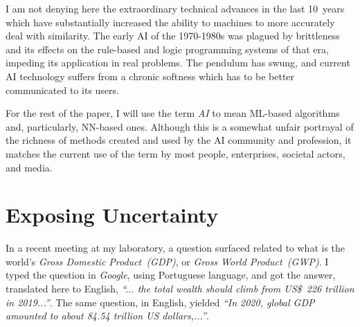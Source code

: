 \documentclass{article}
\begin{document}
I am not denying here the extraordinary technical advances in the last 10~years which have substantially increased the ability to machines to more accurately deal with similarity. The early AI of the 1970-1980s was plagued by brittleness and its effects on the rule-based and logic programming systems of that era, impeding its application in real problems. The pendulum has swung, and current AI technology suffers from a chronic softness which has to be better communicated to its users. 


For the rest of the paper, I will use the term \emph{AI} to mean ML-based algorithms and, particularly, NN-based ones. Although this is a somewhat unfair portrayal of the richness of methods created and used by the AI community and profession, it matches the current use of the term by most people, enterprises, societal actors, and media.%









\section{Exposing Uncertainty}

In a recent meeting at my laboratory, a question surfaced related to what is the world's \emph{Gross Domestic Product~(GDP)}, or \emph{Gross World Product~(GWP)}. I typed the question in \emph{Google}, using Portuguese language, and got the answer, translated here to English, \emph{``... the total wealth should climb from US\$~226 trillion in 2019...''}. The same question, in English, yielded \emph{``In 2020, global GDP amounted to about 84.54 trillion US dollars,...''}.
\end{document}

